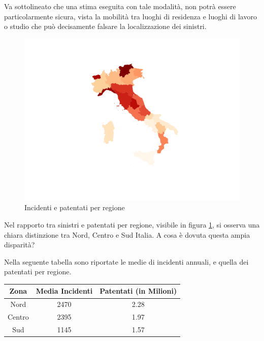 \documentclass[a4paper,12pt]{report}
\begin{document}
Va sottolineato che una stima eseguita con tale modalità, 
non potrà essere particolarmente 
sicura, vista la mobilità tra luoghi di residenza e luoghi di 
lavoro o studio che può decisamente falsare la localizzazione dei sinistri.

\begin{figure}
    \hfill\includegraphics[width=\linewidth]{../src/incidenti/incidenti_aci/mappe_regioni/incidenti_patenti_italia.png}\hspace*{\fill}
    \caption{Incidenti e patentati per regione}
    \label{fig:incidenti-patentati}
\end{figure}

Nel rapporto tra sinistri e patentati per regione, 
visibile in figura \ref{fig:incidenti-patentati}, 
si osserva una chiara distinzione tra Nord, Centro e Sud Italia. 
A cosa è dovuta questa ampia disparità?

Nella seguente tabella sono riportate le medie di incidenti annuali, 
e quella dei patentati per regione. 

\begin{center}
    \def\arraystretch{1.5}%
    \begin{tabular}{ |c|c|c| } 
    \hline
    Zona & Media Incidenti & Patentati (in Milioni) \\ 
    \hline
    \rowcolor{TableGray}
    Nord    &   2470 &   2.28 \\ 
    Centro  &   2395 &   1.97 \\ 
    \rowcolor{TableGray}
    Sud     &   1145 &   1.57 \\ 
    \hline
    \end{tabular}
\end{center}
\end{document}
